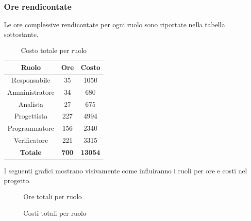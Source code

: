 \subsubsection{Ore rendicontate}
Le ore complessive rendicontate per ogni ruolo sono riportate nella tabella sottostante.
\begin{table}[H]
	\centering
	\begin{tabular}{|c|c|c|}
		\hline
		\textbf{Ruolo} &
		\textbf{Ore} &
		\textbf{Costo} \\
		\hline
		Responsabile & 35 & 1050\\
		\hline
		Amministratore & 34 & 680\\
		\hline
		Analista & 27 & 675\\
		\hline
		Progettista & 227 & 4994 \\
		\hline
		Programmatore & 156 & 2340 \\
		\hline
		Verificatore & 221 & 3315\\
		\hline
		\textbf{Totale} & \textbf{700} & \textbf{13054} \\
		\hline
	\end{tabular}
	\caption{Costo totale per ruolo}
\end{table}
I seguenti grafici mostrano visivamente come influiranno i ruoli per ore e costi nel progetto.
\begin{figure}[H]
	\centering
	\caption{Ore totali per ruolo}
\end{figure}
\begin{figure}[H]
	\centering
	\caption{Costi totali per ruolo}
\end{figure}





